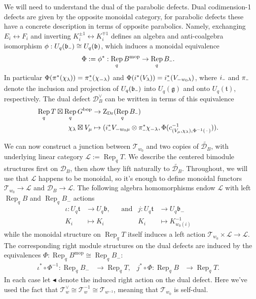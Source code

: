 \documentclass[a4paper]{article}
\numberwithin{equation}{section}
\newcommand{\1}{{\mathrm{1}\mkern-4mu{\mathchoice{}{}{\mskip-0.5mu}{\mskip-1mu}}\mathrm{l}}}
\DeclareMathOperator{\Rep}{Rep}
\newcommand{\D}{\mathcal{D}}
\newcommand{\T}{\mathcal{T}}
\renewcommand{\L}{\mathcal{L}}
\newcommand{\bop}{\text{bop}}
\newcommand{\mop}{\text{mop}}
\newcommand{\Zdr}{\mathrm{Z}_{\text{Dr}}}
\newcommand{\minus}{{\scalebox{0.6}[1.0]{$-$}}}
\begin{document}
We will need to understand the dual of the parabolic defects. 
Dual codimension-1 defects are given by the opposite monoidal category, for parabolic defects these have a concrete description in terms of opposite parabolics. 
Namely, exchanging $E_i \leftrightarrow F_i$ and inverting $K_i^{\pm 1 } \leftrightarrow K_i^{\mp 1}$ defines an algebra and anti-coalgebra isomorphism $\phi: U_q(\mathfrak{b}_\minus)\cong U_q(\mathfrak{b})$, which induces a monoidal equivalence
\begin{align}\label{eq:exchange-borels}
    \Phi := \phi^* :\Rep_q{B}^{\mop} \to \Rep_q{B_{\minus}}.
\end{align}
In particular $\Phi( \pi^*(\chi_\lambda)) = \pi_{\minus}^*(\chi_{-\lambda})$ and $\Phi(i^*(V_\lambda)) = i_{\minus}^*(V_{-w_0\lambda})$, where $i_{\minus}$ and $\pi_{\minus}$ denote the inclusion and projection of $U_q(\mathfrak{b}_{\minus})$ into $U_q(\mathfrak{g})$ and onto $U_q(\mathfrak{t})$, respectively.
The dual defect $\D_B^\vee$ can be written in terms of this equivalence
    \begin{equation}\label{eq:borel-dual}
         \begin{aligned}
       \Rep_q{T} \boxtimes \Rep_q{G}^{\bop} & \rightarrow \Zdr(\Rep_q{B_{\minus}}) \\
    \chi_{\lambda} \boxtimes V_{\mu} & \mapsto (i_{\minus}^\ast V_{-w_0\mu} \otimes \pi^\ast_{\minus} \chi_{-\lambda} , \Phi(c^{-1}_{(V_{\mu} , \chi_{\lambda}) , \Phi^{-1}(\,\cdot\,)})).
    \end{aligned}
    \end{equation}
    
We can now construct a junction between $\T_{w_0}$ and two copies of $\widetilde{\D_B}$, with underlying linear category $\L:=\Rep_q T$.
We describe the centered bimodule structures first on $\D_B$, then show they lift naturally to $\widetilde{\D_B}$.
Throughout, we will use that $\L$ happens to be monoidal, so it's enough to define monoidal functors $\T_{w_0} \to \L$ and $\D_B \to \L$.
The following algebra homomorphisms endow $\L$ with left $\Rep_qB$ and $\Rep_q{B_{-}}$ actions
\begin{equation}
    \begin{aligned}
  \iota : U_q{\mathfrak{t}} &\to U_q{\mathfrak{b}},  &&\text{and}&  j: U_q{\mathfrak{t}} &\to U_q{\mathfrak{b}_{-}}\\
             K_i &\mapsto K_i                         &&&                   K_i  &\mapsto K_{w_0(i)}^{-1}
    \end{aligned}
\end{equation}
 while the monoidal structure on $\Rep_qT$ itself induces a left action $\T_{w_0} \times \L \to \L$.
The corresponding right module structures on the dual defects are induced by the equivalences $\Phi: \Rep_q{B}^{\mop} \cong \Rep_q{B_{-}}$:
\begin{align}
  \iota^*\circ \Phi^{-1}: \Rep_q{B_{-}} &\to \Rep_q{T}, & j^*\circ\Phi: \Rep_q{B} &\to \Rep_q{T}.
\end{align}
In each case let $\blacktriangleleft$ denote the induced right action on the dual defect.
Here we've used the fact that $\T_w^\vee \cong\T_{w}^{-1} \cong \T_{w^{-1}}$, meaning that $\T_{w_0}$ is self-dual.
\end{document}

